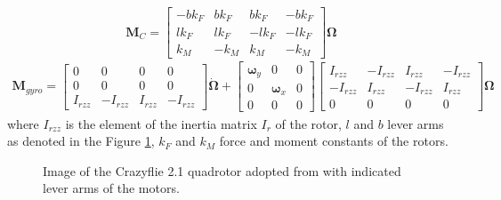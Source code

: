 \documentclass[11pt, a4paper, twoside]{report}
\begin{document}
\begin{equation}
	\bm{M}_C = 	
	\begin{bmatrix}
		-bk_F & bk_F & bk_F & -bk_F \\
		lk_F & lk_F & -lk_F & -lk_F \\
		k_M & -k_M & k_M & -k_M 
	\end{bmatrix} \bm{\Omega}
	\label{eq:m_c}
\end{equation}
\begin{equation}
	\begin{split}
	\bm{M}_{gyro} = 
	\begin{bmatrix}
		0 & 0 & 0 & 0 \\
		0 & 0 & 0 & 0 \\
		I_{rzz} & -I_{rzz} & I_{rzz} & -I_{rzz}
	\end{bmatrix} \bm{\dot{\Omega}}	+
	\begin{bmatrix}
		\bm{\omega}_y & 0 & 0 \\
		0 & \bm{\omega}_x & 0 \\
		0 & 0 & 0 
	\end{bmatrix}	
	\begin{bmatrix}
		I_{rzz} & -I_{rzz} & I_{rzz} & -I_{rzz} \\
		-I_{rzz} & I_{rzz} & -I_{rzz} & I_{rzz} \\
		0 & 0 & 0 & 0 
	\end{bmatrix} \bm{\Omega}
	\label{eq:m_gyro}
	\end{split}
\end{equation}
where $I_{rzz}$ is the element of the inertia matrix $I_{r}$ of the rotor, $l$ and $b$ lever arms as denoted in the Figure \ref{fig:frames_leverarms}, $k_F$ and $k_M$ force and moment constants of the rotors.
\begin{figure}[H]
	\centering 
	\captionsetup{justification=centering, singlelinecheck=off, font=bf, belowskip=-0.5cm}
	\caption[Crazyflie 2.1 nano-quadrotor with indicated lever arms of the motors]{Image of the Crazyflie 2.1 quadrotor adopted from \cite{bitcraze} with indicated lever arms of the motors.}
	\label{fig:frames_leverarms}
\end{figure}
\end{document}
